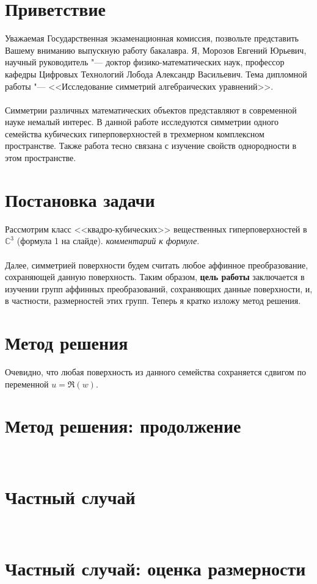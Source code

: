 \documentclass[a4paper,14pt]{extarticle}
\begin{document}
\section{Приветствие}
Уважаемая Государственная экзаменационная комиссия, позвольте представить Вашему вниманию выпускную работу бакалавра. Я, Морозов Евгений Юрьевич, научный руководитель "--- доктор физико-математических наук, профессор кафедры Цифровых Технологий Лобода Александр Васильевич. Тема дипломной работы "--- <<Исследование симметрий алгебраических уравнений>>.
\\~\\
Симметрии различных математических объектов представляют в современной науке немалый интерес. В данной работе исследуются симметрии одного семейства кубических гиперповерхностей в трехмерном комплексном пространстве. Также работа тесно связана с изучение свойств однородности в этом пространстве.


\section{Постановка задачи}
Рассмотрим класс <<квадро-кубических>> вещественных гиперповерхностей в $\mathbb{C}^3$ (формула 1 на слайде). \textit{комментарий к формуле}.
\\~\\
Далее, симметрией поверхности будем считать любое аффинное преобразование, сохраняющей данную поверхность. Таким образом, \textbf{цель работы} заключается в изучении групп аффинных преобразований, сохраняющих данные поверхности, и, в частности, размерностей этих групп. Теперь я кратко изложу метод решения.

\section{Метод решения}
Очевидно, что любая поверхность из данного семейства сохраняется сдвигом по переменной $u = \Re(w)$.

\section{Метод решения: продолжение}
~

\section{Частный случай}
~

\section{Частный случай: оценка размерности}
~
\end{document}

